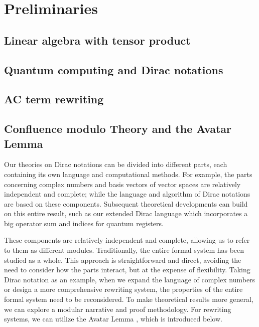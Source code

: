 \documentclass[manuscript, review, timestamp]{acmart}
\begin{document}
\section{Preliminaries}

\subsection{Linear algebra with tensor product}

\subsection{Quantum computing and Dirac notations}

\subsection{AC term rewriting}

\subsection{Confluence modulo Theory and the Avatar Lemma}

Our theories on Dirac notations can be divided into different parts, each containing its own language and computational methods. For example, the parts concerning complex numbers and basis vectors of vector spaces are relatively independent and complete; while the language and algorithm of Dirac notations are based on these components. Subsequent theoretical developments can build on this entire result, such as our extended Dirac language which incorporates a big operator sum and indices for quantum registers.

These components are relatively independent and complete, allowing us to refer to them as different modules. Traditionally, the entire formal system has been studied as a whole. This approach is straightforward and direct, avoiding the need to consider how the parts interact, but at the expense of flexibility. Taking Dirac notation as an example, when we expand the language of complex numbers or design a more comprehensive rewriting system, the properties of the entire formal system need to be reconsidered. To make theoretical results more general, we can explore a modular narrative and proof methodology. For rewriting systems, we can utilize the Avatar Lemma \cite{Arrighi2005}\cite{Arrighi2017}, which is introduced below.

\end{document}
